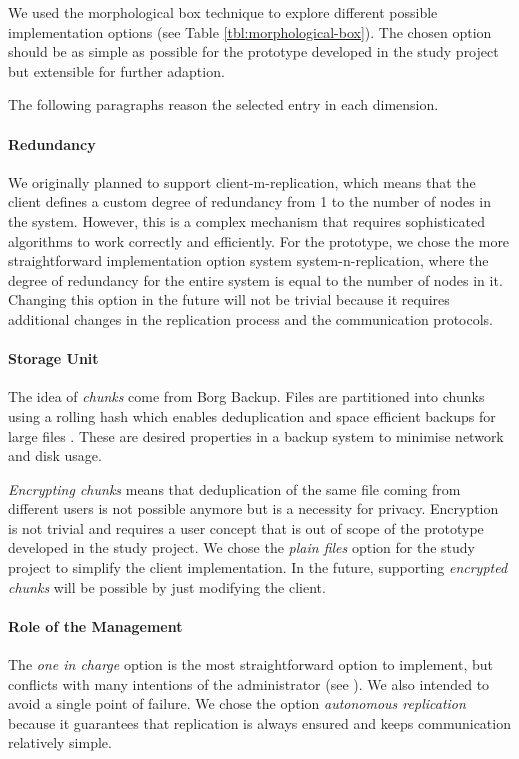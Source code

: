We used the morphological box technique to explore different possible implementation options (see Table \ref{tbl:morphological-box}). The chosen option should be as simple as possible for the prototype developed in the study project but extensible for further adaption.

The following paragraphs reason the selected entry in each dimension.

\paragraph{Redundancy}

We originally planned to support \gls{client-m-replication}, which means that the \gls{client} defines a custom degree of redundancy from 1 to the number of \glspl{node} in the system. However, this is a complex mechanism that requires sophisticated algorithms to work correctly and efficiently. For the prototype, we chose the more straightforward implementation option system \gls{system-n-replication}, where the degree of redundancy for the entire system is equal to the number of \glspl{node} in it. Changing this option in the future will not be trivial because it requires additional changes in the replication process and the communication protocols.

\paragraph{Storage Unit}
The idea of \emph{chunks} come from Borg Backup. Files are partitioned into chunks using a rolling hash which enables deduplication and space efficient backups for large files \cite{borg-data-structures}. These are desired properties in a backup system to minimise network and disk usage.

\emph{Encrypting chunks} means that deduplication of the same file coming from different users is not possible anymore but is a necessity for privacy. Encryption is not trivial and requires a user concept that is out of scope of the prototype developed in the study project.
We chose the \emph{plain files} option for the study project to simplify the \gls{client} implementation. In the future, supporting \emph{encrypted chunks} will be possible by just modifying the \gls{client}.

\paragraph{Role of the Management}
The \emph{one in charge} option is the most straightforward option to implement, but conflicts with many intentions of the administrator (see ). We also intended to avoid a single point of failure. We chose the option \emph{autonomous replication} because it guarantees that replication is always ensured and keeps communication relatively simple.


